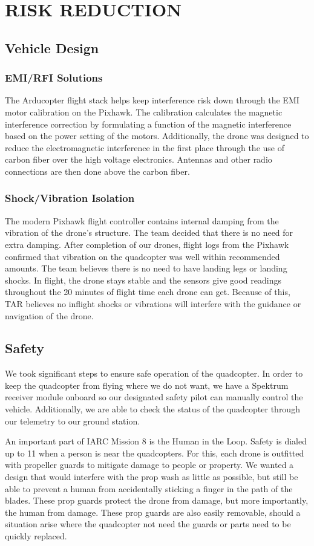 \documentclass[12pt,letterpaper]{article}
\begin{document}
\section*{RISK REDUCTION}
	\subsection*{Vehicle Design}
		\subsubsection*{EMI/RFI Solutions}
		The Arducopter flight stack helps keep interference risk down through the EMI motor calibration on the Pixhawk. The calibration calculates the magnetic interference correction by formulating a function of the magnetic interference based on the power setting of the motors. Additionally, the drone was designed to reduce the electromagnetic interference in the first place through the use of carbon fiber over the high voltage electronics. Antennas and other radio connections are then done above the carbon fiber. 

		\subsubsection*{Shock/Vibration Isolation}
		The modern Pixhawk flight controller contains internal damping from the vibration of the drone's structure. The team decided that there is no need for extra damping. After completion of our drones, flight logs from the Pixhawk confirmed that vibration on the quadcopter was well within recommended amounts. The team believes there is no need to have landing legs or landing shocks. In flight, the drone stays stable and the sensors give good readings throughout the 20 minutes of flight time each drone can get. Because of this, TAR believes no inflight shocks or vibrations will interfere with the guidance or navigation of the drone.


	\subsection*{Safety}
		We took significant steps to ensure safe operation of the quadcopter. In order to keep the quadcopter from flying where we do not want, we have a Spektrum receiver module onboard so our designated safety pilot can manually control the vehicle. Additionally, we are able to check the status of the quadcopter through our telemetry to our ground station. 

An important part of IARC Mission 8 is the Human in the Loop. Safety is dialed up to 11 when a person is near the quadcopters. For this, each drone is outfitted with propeller guards to mitigate damage to people or property. We wanted a design that would interfere with the prop wash as little as possible, but still be able to prevent a human from accidentally sticking a finger in the path of the blades. These prop guards protect the drone from damage, but more importantly, the human from damage. These prop guards are also easily removable, should a situation arise where the quadcopter not need the guards or parts need to be quickly replaced. 
\end{document}
